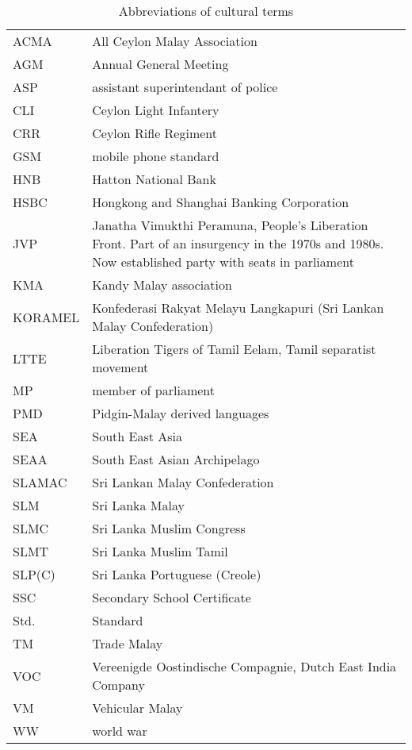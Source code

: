   
\begin{table} 
	\centering
		\begin{tabular}{lp{8cm}}
ACMA 	& All Ceylon Malay Association \\
AGM 	& Annual General Meeting \\
ASP 	& assistant superintendant of police \\
CLI 	& Ceylon Light Infantery\\
CRR 	& Ceylon Rifle Regiment \\
GSM 	& mobile phone standard \\
HNB 	& Hatton National Bank \\
HSBC 	& Hongkong and Shanghai Banking Corporation \\
JVP 	& Janatha Vimukthi Peramuna, People's Liberation Front. Part of an insurgency in the 1970s and 1980s. Now established party with seats in parliament \\
KMA 	& Kandy Malay association \\
KORAMEL & Konfederasi Rakyat Melayu Langkapuri (Sri Lankan Malay Confederation) \\
LTTE 	& Liberation Tigers of Tamil Eelam, Tamil separatist movement \\
MP 	& member of parliament \\
PMD 	& Pidgin-Malay derived languages \\
SEA 	& South East Asia\\
SEAA 	& South East Asian Archipelago\\
SLAMAC 	& Sri Lankan Malay Confederation \\
SLM 	& Sri Lanka Malay \\
SLMC 	& Sri Lanka Muslim Congress \\
SLMT 	& Sri Lanka Muslim Tamil \\
SLP(C) 	& Sri Lanka Portuguese (Creole) \\
SSC 	& Secondary School Certificate \\
Std. 	& Standard\\
TM 	& Trade Malay \\
VOC 	& Vereenigde Oostindische Compagnie, Dutch East India Company \\
VM 	& Vehicular Malay \\
WW 	& world war \\
		\end{tabular}
	\caption{Abbreviations of cultural terms} 
\end{table}







